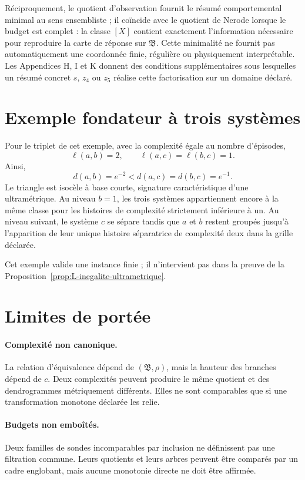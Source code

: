 Réciproquement, le quotient d'observation fournit le résumé
comportemental minimal au sens ensembliste ; il coïncide avec le
quotient de Nerode lorsque le budget est complet : la classe \([X]\) contient exactement
l'information nécessaire pour reproduire la carte de réponse sur
\(\mathfrak B\). Cette minimalité ne fournit pas automatiquement une
coordonnée finie, régulière ou physiquement interprétable. Les
Appendices H, I et K donnent des conditions supplémentaires sous
lesquelles un résumé concret \(s\), \(z_4\) ou \(z_5\) réalise cette
factorisation sur un domaine déclaré.

\section{Exemple fondateur à trois systèmes}
\label{annexe-L-exemple}

Pour le triplet de cet exemple, avec la complexité égale au nombre
d'épisodes,
\[
\ell(a,b)=2,
\qquad
\ell(a,c)=\ell(b,c)=1.
\]
Ainsi,
\[
d(a,b)=e^{-2}
<
 d(a,c)=d(b,c)=e^{-1}.
\]
Le triangle est isocèle à base courte, signature caractéristique d'une
ultramétrique. Au niveau \(b=1\), les trois systèmes appartiennent encore
à la même classe pour les histoires de complexité strictement inférieure
à un. Au niveau suivant, le système \(c\) se sépare tandis que \(a\) et \(b\)
restent groupés jusqu'à l'apparition de leur unique histoire séparatrice
de complexité deux dans la grille déclarée.

Cet exemple valide une instance finie ; il n'intervient pas dans la
preuve de la Proposition~\ref{prop:L-inegalite-ultrametrique}.

\section{Limites de portée}
\label{annexe-L-limites}

\paragraph{Complexité non canonique.}
La relation d'équivalence dépend de \((\mathfrak B,\rho)\), mais la
hauteur des branches dépend de \(c\). Deux complexités peuvent produire
le même quotient et des dendrogrammes métriquement différents. Elles ne
sont comparables que si une transformation monotone déclarée les relie.

\paragraph{Budgets non emboîtés.}
Deux familles de sondes incomparables par inclusion ne définissent pas
une filtration commune. Leurs quotients et leurs arbres peuvent être
comparés par un cadre englobant, mais aucune monotonie directe ne doit
être affirmée.

